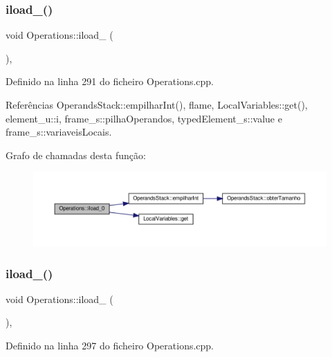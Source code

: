 \subsubsection{\texorpdfstring{iload\+\_()}{iload\_0()}}
{\footnotesize\ttfamily void Operations\+::iload\+\_ (\begin{DoxyParamCaption}{ }\end{DoxyParamCaption})\hspace{0.3cm}{\ttfamily [static]}, {\ttfamily [private]}}



Definido na linha 291 do ficheiro Operations.\+cpp.



Referências Operands\+Stack\+::empilhar\+Int(), flame, Local\+Variables\+::get(), element\+\_\+u\+::i, frame\+\_\+s\+::pilha\+Operandos, typed\+Element\+\_\+s\+::value e frame\+\_\+s\+::variaveis\+Locais.

Grafo de chamadas desta função\+:
\nopagebreak
\begin{figure}[H]
\begin{center}
\leavevmode
\includegraphics[width=350pt]{classOperations_a3aba059cf78681767c141d27989fc2aa_cgraph}
\end{center}
\end{figure}
\mbox{\label{classOperations_a4b9d8ef21894c0db2203c06712e97765}} 
\subsubsection{\texorpdfstring{iload\+\_()}{iload\_1()}}
{\footnotesize\ttfamily void Operations\+::iload\+\_ (\begin{DoxyParamCaption}{ }\end{DoxyParamCaption})\hspace{0.3cm}{\ttfamily [static]}, {\ttfamily [private]}}



Definido na linha 297 do ficheiro Operations.\+cpp.



